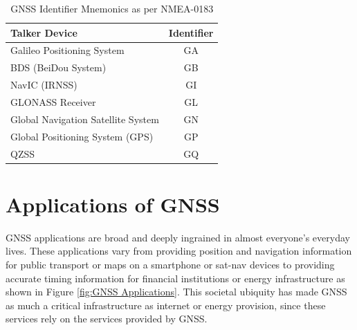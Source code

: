 \renewcommand{\arraystretch}{1.5}
\begin{table}
    \begin{center}
        \caption{GNSS Identifier Mnemonics as per NMEA-0183 \cite{RN71}}
        \label{tab:NMEA Mnemonics}
        \begin{tabular}{ l|c }
            \hline
            \textbf{Talker Device} & \textbf{Identifier} \\
            \hline
            Galileo Positioning System & GA \\
            BDS (BeiDou System) & GB \\
            NavIC (IRNSS) & GI \\
            GLONASS Receiver & GL \\
            Global Navigation Satellite System & GN \\
            Global Positioning System (GPS) & GP \\
            QZSS & GQ \\
            \hline
        \end{tabular}
    \end{center}
\end{table}
\renewcommand{\arraystretch}{1}


\section{Applications of GNSS} \label{sec:ApplicationsGNSS}
GNSS applications are broad and deeply ingrained in almost everyone's everyday lives. These applications vary from providing position and navigation information for public
transport or maps on a smartphone or sat-nav devices to providing accurate timing information for financial institutions or energy infrastructure \cite{RN33} \cite{RN12}
as shown in Figure \ref{fig:GNSS Applications}. This societal ubiquity has made GNSS as much a critical infrastructure as internet or energy provision, since these
services rely on the services provided by GNSS.

